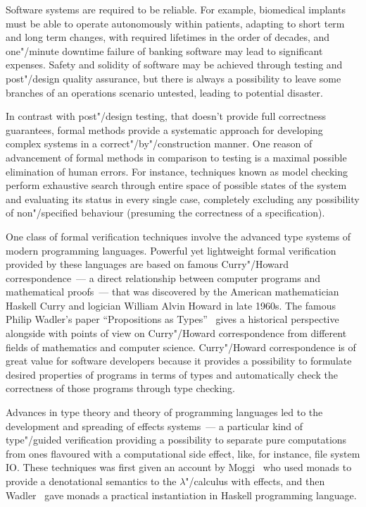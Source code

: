 \Intro

Software systems are required to be reliable. For example, biomedical implants must be able to operate autonomously within patients, adapting to short term and long term changes, with required lifetimes in the order of decades, and one"/minute downtime failure of banking software may lead to significant expenses. Safety and solidity of software may be achieved through testing and post"/design quality assurance, but there is always a possibility to leave some branches of an operations scenario untested, leading to potential disaster.

In contrast with post"/design testing, that doesn’t provide full
correctness guarantees, formal methods provide a systematic approach for developing
complex systems in a correct"/by"/construction manner. One reason of advancement of
formal methods in comparison to testing is a maximal possible elimination of human errors.
For instance, techniques known as model checking perform exhaustive search
through entire space of possible states of the system and evaluating its status in
every single case, completely excluding any possibility of non"/specified behaviour
(presuming the correctness of a specification).

One class of formal verification techniques involve the advanced type systems of
modern programming languages. Powerful yet lightweight formal verification
provided by these languages are based on famous Curry"/Howard correspondence~---
a direct relationship between computer programs and mathematical
proofs~--- that was discovered by the American mathematician Haskell Curry and logician
William Alvin Howard in late 1960s. The famous Philip Wadler’s paper
``Propositions as Types''~\cite{Wadler:2015:PT:2847579.2699407}
gives a historical perspective alongside with points of view on
Curry"/Howard correspondence from different fields of
mathematics and computer science. Curry"/Howard correspondence is of great value
for software developers because it provides a possibility to formulate desired
properties of programs in terms of types and automatically check
the correctness of those programs through type checking.

Advances in type theory and theory of programming languages led to the development
and spreading of effects systems~--- a particular kind of type"/guided verification
providing a possibility to separate pure computations from ones flavoured with
a computational side effect, like, for instance, file system IO. These techniques
was first given an account by Moggi~\cite{Moggi:1991:NCM:116981.116984} who
used monads to provide a denotational semantics to the $\lambda$"/calculus with effects,
and then Wadler~\cite{Wadler:1992:EFP:143165.143169} gave monads a practical instantiation in
Haskell programming language.

